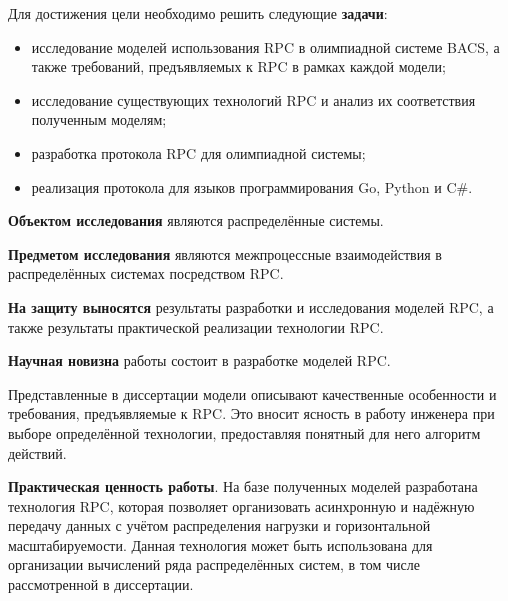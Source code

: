 Для достижения цели необходимо решить следующие \textbf{задачи}:
\begin{itemize}
    \item исследование моделей использования RPC в олимпиадной системе BACS,
        а также требований, предъявляемых к RPC в рамках каждой модели;
    \item исследование существующих технологий RPC и анализ их соответствия
        полученным моделям;
    \item разработка протокола RPC для олимпиадной системы;
    \item реализация протокола для языков программирования Go, Python и C\#.
\end{itemize}



\textbf{Объектом исследования} являются распределённые системы.

\textbf{Предметом исследования} являются межпроцессные взаимодействия
в распределённых системах посредством RPC.

\textbf{На защиту выносятся} результаты разработки и исследования моделей RPC,
а также результаты практической реализации технологии RPC.

\textbf{Научная новизна} работы состоит в разработке моделей RPC.

Представленные в диссертации модели описывают качественные особенности
и требования, предъявляемые к RPC. Это вносит ясность в работу инженера
при выборе определённой технологии, предоставляя понятный для него
алгоритм действий.

\textbf{Практическая ценность работы}. На базе полученных моделей
разработана технология RPC, которая позволяет организовать асинхронную
и надёжную передачу данных с учётом распределения нагрузки и горизонтальной
масштабируемости. Данная технология может быть использована для организации
вычислений ряда распределённых систем, в том числе рассмотренной в диссертации.

